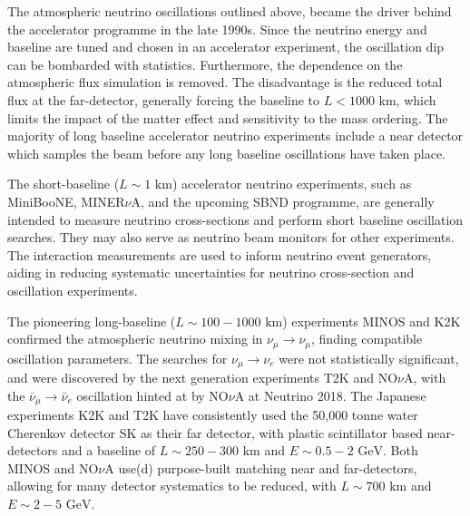 The atmospheric neutrino oscillations outlined above, became the driver behind the accelerator programme in the late 1990s. Since the neutrino energy and baseline are tuned and chosen in an accelerator experiment, the oscillation dip can be bombarded with statistics. Furthermore, the dependence on the atmospheric flux simulation is removed\cite{lbnl_review}. The disadvantage is the reduced total flux at the far-detector, generally forcing the baseline to $L<1000\text{ km}$, which limits the impact of the matter effect and sensitivity to the mass ordering. The majority of long baseline accelerator neutrino experiments include a near detector which samples the beam before any long baseline oscillations have taken place.

The short-baseline ($L\sim 1\text{ km}$) accelerator neutrino experiments, such as MiniBooNE\cite{mb_design}, MINER$\nu$A\cite{minerva_design}, and the upcoming SBND programme\cite{sbnd}, are generally intended to measure neutrino cross-sections and perform short baseline oscillation searches. They may also serve as neutrino beam monitors for other experiments. The interaction measurements are used to inform neutrino event generators\cite{neut,genie,NuWro}, aiding in reducing systematic uncertainties for neutrino cross-section and oscillation experiments.

The pioneering long-baseline ($L\sim 100-1000\text{ km}$) experiments MINOS\cite{minos_obs} and K2K\cite{k2k_obs} confirmed the atmospheric neutrino mixing in $\nu_\mu \rightarrow \nu_\mu$, finding compatible oscillation parameters. The searches for $\nu_\mu \rightarrow \nu_e$ were not statistically significant\cite{k2k_noobs,minos_disc}, and were discovered by the next generation experiments T2K\cite{t2k_disc} and NO$\nu$A\cite{nova_disc}, with the $\bar{\nu}_\mu \rightarrow \bar{\nu}_e$ oscillation hinted at by NO$\nu$A at Neutrino 2018\cite{nova_neutrino2018}. The Japanese experiments K2K and T2K have consistently used the 50,000 tonne water Cherenkov detector SK\cite{superk} as their far detector, with plastic scintillator based near-detectors and a baseline of $L\sim250-300\text{ km}$ and $E\sim0.5-2\text{ GeV}$. Both MINOS and NO$\nu$A use(d) purpose-built matching near and far-detectors, allowing for many detector systematics to be reduced, with $L\sim700\text{ km}$ and $E\sim2-5\text{ GeV}$.

